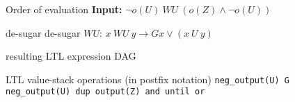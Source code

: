 \begin{frame}{Order of evaluation}{}
{\bf Input:} $ \neg o(U)\ WU\ (o(Z) \wedge \neg o(U)) $\\
\begin{block}{de-sugar}
de-sugar $WU$: $ x\ WU\ y \rightarrow G x \vee (x\ U\ y)$\\
\end{block}
\begin{block}{resulting LTL expression DAG}
\end{block}

\begin{block}{LTL value-stack operations (in postfix notation)}
\texttt{\footnotesize neg\_output(U) G neg\_output(U) dup output(Z) and until or}
\end{block}
\end{frame}



